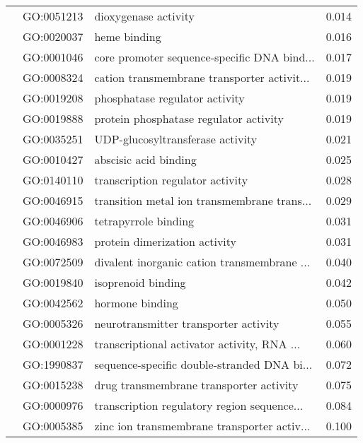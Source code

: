 \begin{longtable}{lllr}
   & GO:0051213 &                         dioxygenase activity &         0.014 \\
   & GO:0020037 &                                 heme binding &         0.016 \\
   & GO:0001046 &  core promoter sequence-specific DNA bind... &         0.017 \\
   & GO:0008324 &  cation transmembrane transporter activit... &         0.019 \\
   & GO:0019208 &               phosphatase regulator activity &         0.019 \\
   & GO:0019888 &       protein phosphatase regulator activity &         0.019 \\
   & GO:0035251 &             UDP-glucosyltransferase activity &         0.021 \\
   & GO:0010427 &                        abscisic acid binding &         0.025 \\
   & GO:0140110 &             transcription regulator activity &         0.028 \\
   & GO:0046915 &  transition metal ion transmembrane trans... &         0.029 \\
   & GO:0046906 &                         tetrapyrrole binding &         0.031 \\
   & GO:0046983 &                protein dimerization activity &         0.031 \\
   & GO:0072509 &  divalent inorganic cation transmembrane ... &         0.040 \\
   & GO:0019840 &                           isoprenoid binding &         0.042 \\
   & GO:0042562 &                              hormone binding &         0.050 \\
   & GO:0005326 &        neurotransmitter transporter activity &         0.055 \\
   & GO:0001228 &  transcriptional activator activity, RNA ... &         0.060 \\
   & GO:1990837 &  sequence-specific double-stranded DNA bi... &         0.072 \\
   & GO:0015238 &      drug transmembrane transporter activity &         0.075 \\
   & GO:0000976 &  transcription regulatory region sequence... &         0.084 \\
   & GO:0005385 &  zinc ion transmembrane transporter activ... &         0.100 \\
\end{longtable}
